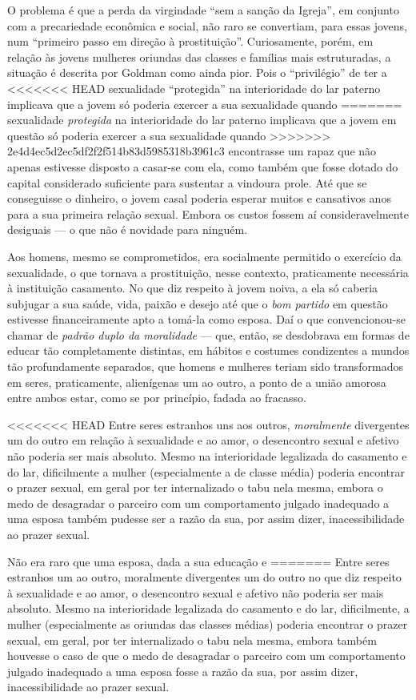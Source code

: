 {O problema é que a perda da virgindade ``sem a sanção da
Igreja'', em conjunto com a precariedade econômica e social, não raro se
convertiam, para essas jovens, num ``primeiro passo em direção à
prostituição''. Curiosamente, porém, em relação às jovens
mulheres oriundas das classes e famílias mais estruturadas, a situação é
descrita por Goldman como ainda pior. Pois o ``privilégio'' de ter a
<<<<<<< HEAD
sexualidade ``protegida'' na interioridade do lar paterno implicava que
a jovem só poderia exercer a sua sexualidade quando
=======
sexualidade \textit{protegida} na interioridade do lar paterno implicava que
a jovem em questão só poderia exercer a sua sexualidade quando
>>>>>>> 2e4d4ec5d2ec5df2f2f514b83d5985318b3961c3
encontrasse um rapaz que não apenas estivesse disposto a casar-se com
ela, como também que fosse dotado do capital considerado
suficiente para sustentar a vindoura prole. Até que se conseguisse o
dinheiro, o jovem casal poderia esperar muitos e
cansativos anos para a sua primeira relação sexual. Embora os
custos fossem aí consideravelmente desiguais --- o que não é novidade
para ninguém.

Aos homens, mesmo se comprometidos, era socialmente
permitido o exercício da sexualidade, o que tornava a prostituição,
nesse contexto, praticamente necessária à instituição
casamento. No que diz respeito à jovem noiva, a ela só caberia subjugar
a sua saúde, vida, paixão e desejo até que o \textit{bom partido} em questão
estivesse financeiramente apto a tomá-la como esposa. Daí o que
convencionou-se chamar de \textit{padrão duplo da moralidade} --- que, então,
se desdobrava em formas de educar tão completamente distintas, em
hábitos e costumes condizentes a mundos tão profundamente separados, que
homens e mulheres teriam sido transformados em seres, praticamente,
alienígenas um ao outro, a ponto de a união amorosa entre ambos estar,
como se por princípio, fadada ao fracasso.

<<<<<<< HEAD
Entre seres estranhos uns aos outros, \emph{moralmente} divergentes um do
outro em relação à sexualidade e ao amor, o desencontro sexual
e afetivo não poderia ser mais absoluto. Mesmo na interioridade
legalizada do casamento e do lar, dificilmente a mulher (especialmente
a de classe média) poderia encontrar o prazer sexual, em
geral por ter internalizado o tabu nela mesma, embora
o medo de desagradar o parceiro com um comportamento julgado
inadequado a uma esposa também pudesse ser a razão da sua, por assim dizer,
inacessibilidade ao prazer sexual.

Não era raro que uma esposa, dada a sua educação e
=======
Entre seres estranhos um ao outro, moralmente divergentes um do
outro no que diz respeito à sexualidade e ao amor, o desencontro sexual
e afetivo não poderia ser mais absoluto. Mesmo na interioridade
legalizada do casamento e do lar, dificilmente, a mulher (especialmente
as oriundas das classes médias) poderia encontrar o prazer sexual, em
geral, por ter internalizado o tabu nela mesma, embora também houvesse o
caso de que o medo de desagradar o parceiro com um comportamento julgado
inadequado a uma esposa fosse a razão da sua, por assim dizer,
inacessibilidade ao prazer sexual. 

}
